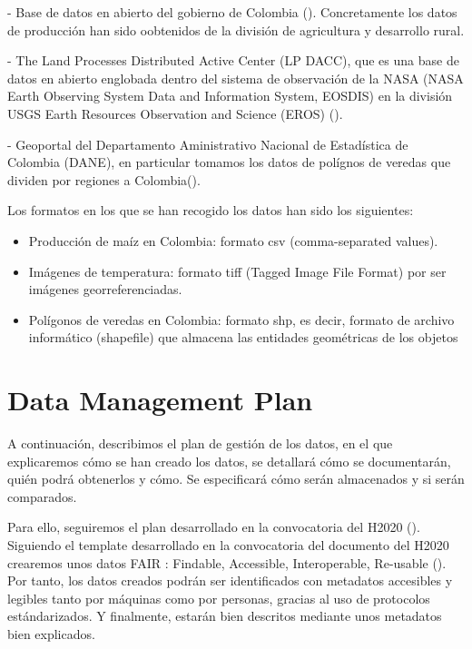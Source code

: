 \documentclass[12pt, spanish]{article}
\begin{document}
- Base de datos en abierto del gobierno de Colombia (\cite{GobiernodeColombia2018}). Concretamente los datos de producción han sido oobtenidos de la división de agricultura y desarrollo rural.

- The Land Processes Distributed Active Center (LP DACC), que es una base de datos en abierto englobada dentro del sistema de observación de la NASA (NASA Earth Observing System Data and Information System, EOSDIS) en la división USGS Earth Resources Observation and Science (EROS) (\cite{NASALPDAACattheUSGSEROSCenter2019}).

- Geoportal del Departamento Aministrativo Nacional de Estadística de Colombia (DANE), en particular tomamos los datos de polígnos de veredas que dividen por regiones a Colombia(\cite{DANECOL2017}).

Los formatos en los que se han recogido los datos han sido los siguientes:
\begin{itemize}
    \item Producción de maíz en Colombia: formato csv (comma-separated values).
    \item Imágenes de temperatura: formato tiff (Tagged Image File Format) por ser imágenes georreferenciadas.
    \item Polígonos de veredas en Colombia: formato shp, es decir, formato de archivo informático (shapefile) que almacena las entidades geométricas de los objetos
\end{itemize}

\section{Data Management Plan}

A continuación, describimos el plan de gestión de los datos, en el que explicaremos cómo se han creado los datos, se detallará cómo se documentarán, quién podrá obtenerlos y cómo. Se especificará cómo serán almacenados y si serán comparados. 

Para ello, seguiremos el plan desarrollado en la convocatoria del H2020 (\cite{horizon2020dmp2019}). Siguiendo el template desarrollado en la convocatoria del documento del H2020 crearemos unos datos FAIR : Findable, Accessible, Interoperable, Re-usable (\cite{GOFARE2018}). Por tanto, los datos creados podrán ser identificados con metadatos accesibles y legibles tanto por máquinas como por personas, gracias al uso de protocolos estándarizados. Y finalmente, estarán bien descritos mediante unos metadatos bien explicados. 
\end{document}
